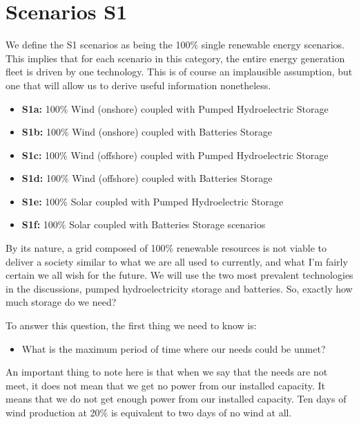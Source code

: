 \section{Scenarios S1}

We define the S1 scenarios as being the 100\% single renewable energy scenarios. This implies that for each scenario in this category, the entire energy generation fleet is driven by one technology. This is of course an implausible assumption, but one that will allow us to derive useful information nonetheless.

\begin{kaobox}[frametitle=S1 scenarios]
\begin{itemize}
	\item \textbf{S1a:} 100\% Wind (onshore) coupled with Pumped Hydroelectric Storage
	\item \textbf{S1b:} 100\% Wind (onshore) coupled with Batteries Storage
	\item \textbf{S1c:} 100\% Wind (offshore) coupled with Pumped Hydroelectric Storage
	\item \textbf{S1d:} 100\% Wind (offshore) coupled with Batteries Storage
	\item \textbf{S1e:} 100\% Solar coupled with Pumped Hydroelectric Storage
	\item \textbf{S1f:} 100\% Solar coupled with Batteries Storage scenarios
\end{itemize}
\end{kaobox}

By its nature, a grid composed of 100\% renewable resources is not viable to deliver a society similar to what we are all used to currently, and what I'm fairly certain we all wish for the future. We will use the two most prevalent technologies in the discussions, pumped hydroelectricity storage and batteries. So, exactly how much storage do we need?

To answer this question, the first thing we need to know is:

\begin{itemize}
\item What is the maximum period of time where our needs could be unmet?
\end{itemize}

An important thing to note here is that when we say that the needs are not meet, it does not mean that we get no power from our installed capacity. It means that we do not get enough power from our installed capacity. Ten days of wind production at 20\% is equivalent to two days of no wind at all.

